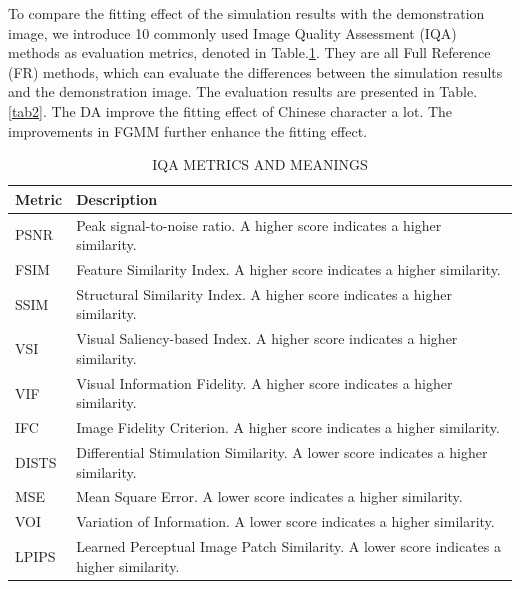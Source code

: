 \documentclass[journal]{IEEEtran}
\begin{document}
To compare the fitting effect of the simulation results with the demonstration image, we introduce 10 commonly used Image Quality Assessment (IQA) methods as evaluation metrics, denoted in Table.\ref{tab1}. They are all Full Reference (FR) methods, which can evaluate the differences between the simulation results and the demonstration image. The evaluation results are presented in Table.\ref{tab2}. The DA improve the fitting effect of Chinese character a lot. The improvements in FGMM further enhance the fitting effect.  
\begin{table}[!t]
\centering  
\caption{IQA METRICS AND MEANINGS}
\label{tab1}
\begin{tabularx}{3in}{lX}
\toprule
Metric & Description\\
\midrule
PSNR & Peak signal-to-noise ratio. A higher score indicates a higher similarity.\\
FSIM & Feature Similarity Index. A higher score indicates a higher similarity.\\
SSIM & Structural Similarity Index. A higher score indicates a higher similarity.\\
VSI & Visual Saliency-based Index. A higher score indicates a higher similarity.\\
VIF & Visual Information Fidelity. A higher score indicates a higher similarity.\\ 
IFC & Image Fidelity Criterion. A higher score indicates a higher similarity.\\
DISTS & Differential Stimulation Similarity. A lower score indicates a higher similarity.\\
MSE & Mean Square Error. A lower score indicates a higher similarity.\\
VOI & Variation of Information. A lower score indicates a higher similarity.\\
LPIPS & Learned Perceptual Image Patch Similarity. A lower score indicates a higher similarity.\\
\bottomrule
\end{tabularx}
\end{table}

\end{document}
